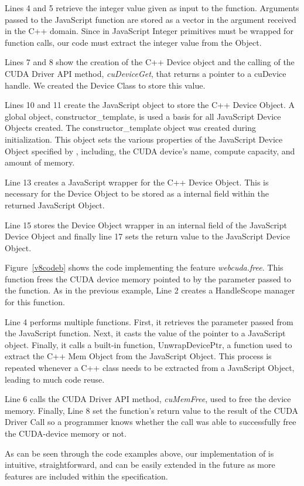 Lines 4 and 5 retrieve the integer value given as
input to the function. Arguments passed to the JavaScript function are stored
as a vector in the argument received in the C++ domain. Since in JavaScript
Integer primitives must be wrapped for function calls, our code must extract the
integer value from the Object.

Lines 7 and 8 show the creation of the C++ Device object and the calling of the
CUDA Driver API method, \textit{cuDeviceGet}, that returns a pointer to a
cuDevice handle. We created the Device Class to store this value.

Lines 10 and 11 create the JavaScript object to store the C++ Device Object. A
global object, constructor\_template, is used a basis for all JavaScript Device
Objects created. The constructor\_template object was created during
initialization. This object sets the various properties of the JavaScript Device
Object specified by \namens, including, the CUDA device's name, compute
capacity, and amount of memory.

Line 13 creates a JavaScript wrapper for the C++ Device Object. This is
necessary for the Device Object to be stored as a internal field within the
returned JavaScript Object.

Line 15 stores the Device Object wrapper in an internal field of the JavaScript
Device Object and finally line 17 sets the return value to the JavaScript Device
Object.


Figure~\ref{v8codeb} shows the code implementing the \name feature
\textit{webcuda.free}. This function frees the CUDA device memory pointed to by
the parameter passed to the function. As in the previous example, Line 2 creates
a HandleScope manager for this function. 

Line 4 performs multiple functions. First, it retrieves the parameter passed
from the JavaScript function. Next, it casts the value of the pointer to a
JavaScript object. Finally, it calls a built-in function, UnwrapDevicePtr, a
function used to extract the C++ Mem Object from the JavaScript Object. This
process is repeated whenever a C++ class needs to be extracted from a JavaScript
Object, leading to much code reuse.

Line 6 calls the CUDA Driver API method, \textit{cuMemFree}, used to free the
device memory. Finally, Line 8 set the function's return value to the result of
the CUDA Driver Call so a programmer knows whether the call was able to
successfully free the CUDA-device memory or not.


As can be seen through the code examples above, our implementation of \name is intuitive,
straightforward, and can be easily extended in the future as more features are
included within the \name specification.


